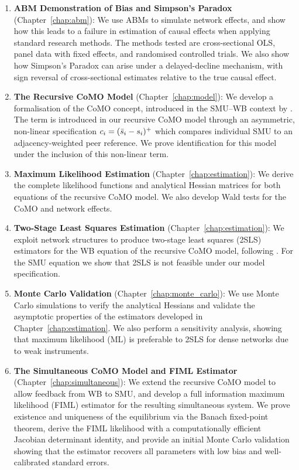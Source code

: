 \begin{enumerate}
    \item \textbf{ABM Demonstration of Bias and Simpson's Paradox} (Chapter~\ref{chap:abm}):
          We use ABMs to simulate network effects, and show how this leads to a failure in estimation of causal effects when applying standard research methods. The methods tested are cross-sectional OLS, panel data with fixed effects, and randomised controlled trials. We also show how Simpson's Paradox can arise under a delayed-decline mechanism, with sign reversal of cross-sectional estimates relative to the true causal effect.

    \item \textbf{The Recursive CoMO Model} (Chapter~\ref{chap:model}):
          We develop a formalisation of the CoMO concept, introduced in the SMU--WB context by \textcite[Eqs.~1--2]{DahlFoldnesGronneberg2024}. The term is introduced in our recursive CoMO model through an asymmetric, non-linear specification $c_i = (\bar{s}_i - s_i)^+$ which compares individual SMU to an adjacency-weighted peer reference. We prove identification for this model under the inclusion of this non-linear term.

    \item \textbf{Maximum Likelihood Estimation} (Chapter~\ref{chap:estimation}):
          We derive the complete likelihood functions and analytical Hessian matrices for both equations of the recursive CoMO model. We also develop Wald tests for the CoMO and network effects.

    \item \textbf{Two-Stage Least Squares Estimation} (Chapter~\ref{chap:estimation}):
          We exploit network structures to produce two-stage least squares (2SLS) estimators for the WB equation of the recursive CoMO model, following \textcite{Bramoulle2009}. For the SMU equation we show that 2SLS is not feasible under our model specification.

    \item \textbf{Monte Carlo Validation} (Chapter~\ref{chap:monte_carlo}):
          We use Monte Carlo simulations to verify the analytical Hessians and validate the asymptotic properties of the estimators developed in Chapter~\ref{chap:estimation}. We also perform a sensitivity analysis, showing that maximum likelihood (ML) is preferable to 2SLS for dense networks due to weak instruments.

    \item \textbf{The Simultaneous CoMO Model and FIML Estimator} (Chapter~\ref{chap:simultaneous}):
          We extend the recursive CoMO model to allow feedback from WB to SMU, and develop a full information maximum likelihood (FIML) estimator for the resulting simultaneous system. We prove existence and uniqueness of the equilibrium via the Banach fixed-point theorem, derive the FIML likelihood with a computationally efficient Jacobian determinant identity, and provide an initial Monte Carlo validation showing that the estimator recovers all parameters with low bias and well-calibrated standard errors.
\end{enumerate}

